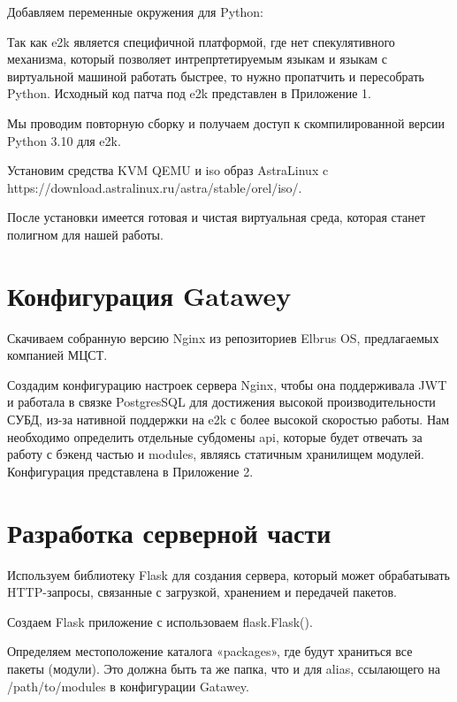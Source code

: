 \begin{listing}[H]
\end{listing}
\label{lst:c}

Добавляем переменные окружения для Python:

\begin{listing}[H]
\end{listing}
\label{lst:c}

Так как e2k является специфичной платформой, где нет спекулятивного механизма, который позволяет интрепртетируемым языкам и языкам с виртуальной машиной работать быстрее, то нужно пропатчить и пересобрать Python. Исходный код патча под e2k представлен в Приложение 1.

Мы проводим повторную сборку и получаем доступ к скомпилированной версии Python 3.10 для e2k.

Установим средства KVM QEMU и iso образ AstraLinux c https://download.astralinux.ru/astra/stable/orel/iso/.

После установки имеется готовая и чистая виртуальная среда, которая станет полигном для нашей работы. 

\section{Конфигурация Gatawey}

Скачиваем собранную версию Nginx из репозиториев Elbrus OS, предлагаемых компанией МЦСТ.

Создадим конфигурацию настроек сервера Nginx, чтобы она поддерживала JWT и работала в связке PostgresSQL для достижения высокой производительности СУБД, из-за нативной поддержки на e2k с более высокой скоростью работы. Нам необходимо определить отдельные субдомены api, которые будет отвечать за работу с бэкенд частью и modules, являясь статичным хранилищем модулей. Конфигурация представлена в Приложение 2.

\section{Разработка серверной части}

Используем библиотеку Flask для создания сервера, который может обрабатывать HTTP-запросы, связанные с загрузкой, хранением и передачей пакетов.

Создаем Flask приложение с использоваем flask.Flask(). 

Определяем местоположение каталога «packages», где будут храниться все пакеты (модули). Это должна быть та же папка, что и для alias, ссылающего на /path/to/modules в конфигурации Gatawey. 

